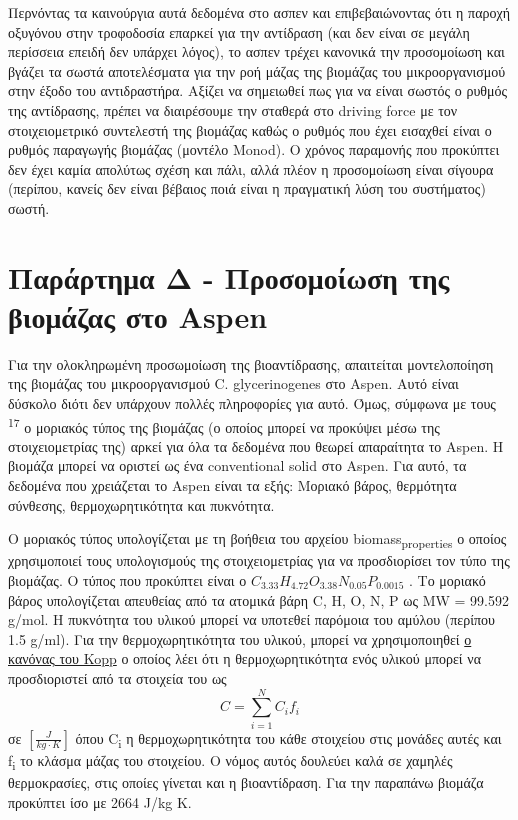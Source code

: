 \documentclass[11pt]{article}
\makeatletter
\newcommand{\citeprocitem}[2]{\hyper@linkstart{cite}{citeproc_bib_item_#1}#2\hyper@linkend}
\makeatother
\begin{document}
Περνόντας τα καινούργια αυτά δεδομένα στο ασπεν και επιβεβαιώνοντας ότι η παροχή οξυγόνου στην τροφοδοσία επαρκεί για την αντίδραση (και δεν είναι σε μεγάλη περίσσεια επειδή δεν υπάρχει λόγος), το ασπεν τρέχει κανονικά την προσομοίωση και βγάζει τα σωστά αποτελέσματα για την ροή μάζας της βιομάζας του μικροοργανισμού στην έξοδο του αντιδραστήρα. Αξίζει να σημειωθεί πως για να είναι σωστός ο ρυθμός της αντίδρασης, πρέπει να διαιρέσουμε την σταθερά στο driving force με τον στοιχειομετρικό συντελεστή της βιομάζας καθώς ο ρυθμός που έχει εισαχθεί είναι ο ρυθμός παραγωγής βιομάζας (μοντέλο Monod). Ο χρόνος παραμονής που προκύπτει δεν έχει καμία απολύτως σχέση και πάλι, αλλά πλέον η προσομοίωση είναι σίγουρα (περίπου, κανείς δεν είναι βέβαιος ποιά είναι η πραγματική λύση του συστήματος) σωστή. 

\section{Παράρτημα Δ - Προσομοίωση της βιομάζας στο Aspen}
\label{sec:org746c4dc}
Για την ολοκληρωμένη προσωμοίωση της βιοαντίδρασης, απαιτείται μοντελοποίηση της βιομάζας του μικροοργανισμού C. glycerinogenes στο Aspen. Αυτό είναι δύσκολο διότι δεν υπάρχουν πολλές πληροφορίες για αυτό. Όμως, σύμφωνα με τους \textsuperscript{\citeprocitem{17}{17}} ο μοριακός τύπος της βιομάζας (ο οποίος μπορεί να προκύψει μέσω της στοιχειομετρίας της) αρκεί για όλα τα δεδομένα που θεωρεί απαραίτητα το Aspen. Η βιομάζα μπορεί να οριστεί ως ένα conventional solid στο Aspen. Για αυτό, τα δεδομένα που χρειάζεται το Aspen είναι τα εξής: Μοριακό βάρος, θερμότητα σύνθεσης, θερμοχωρητικότητα και πυκνότητα.

Ο μοριακός τύπος υπολογίζεται με τη βοήθεια του αρχείου biomass\textsubscript{properties} ο οποίος χρησιμοποιεί τους υπολογισμούς της στοιχειομετρίας για να προσδιορίσει τον τύπο της βιομάζας. Ο τύπος που προκύπτει είναι ο \(C_{3.33}H_{4.72}O_{3.38}N_{0.05}P_{0.0015}\) . Το μοριακό βάρος υπολογίζεται απευθείας από τα ατομικά βάρη C, H, O, N, P ως MW = 99.592 g/mol. Η πυκνότητα του υλικού μπορεί να υποτεθεί παρόμοια του αμύλου (περίπου 1.5 g/ml). Για την θερμοχωρητικότητα του υλικού, μπορεί να χρησιμοποιηθεί \href{https://en.wikipedia.org/wiki/Kopp\%27s\_law}{ο κανόνας του Kopp} ο οποίος λέει ότι η θερμοχωρητικότητα ενός υλικού μπορεί να προσδιοριστεί από τα στοιχεία του ως \[ C = \sum_{i=1}^{N} C_{i}f_i \] σε \(\left[ \frac{J}{kg \cdot K} \right]\) όπου C\textsubscript{i} η θερμοχωρητικότητα του κάθε στοιχείου στις μονάδες αυτές και f\textsubscript{i} το κλάσμα μάζας του στοιχείου. Ο νόμος αυτός δουλεύει καλά σε χαμηλές θερμοκρασίες, στις οποίες γίνεται και η βιοαντίδραση. Για την παραπάνω βιομάζα προκύπτει ίσο με 2664 J/kg K.
\end{document}
